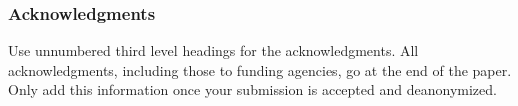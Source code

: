 \documentclass[11pt]{report} %
\begin{document}



\tableofcontents


















\subsubsection*{Acknowledgments}
\label{sec:ack}
Use unnumbered third level headings for the acknowledgments. All acknowledgments, including those to funding agencies, go at the end of the paper. Only add this information once your submission is accepted and deanonymized. 



\appendix

\end{document}
